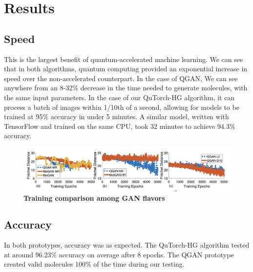 \documentclass{scrartcl}
\begin{document}
\section{Results}
\label{sec:org1d10bc6}

\subsection{Speed}
\label{sec:orgfee545b}

This is the largest benefit of quantum-accelerated machine learning.  We can see that in both algorithms, quantum computing provided an exponential increase in speed over the non-accelerated counterpart. In the case of QGAN, We can see anywhere from an 8-32\% decrease in the time needed to generate molecules, with the same input parameters. In the case of our QuTorch-HG algorithm, it can process a batch of images within 1/10th of a second, allowing for models to be trained at 95\% accuracy in under 5 minutes. A similar model, written with TensorFlow and trained on the same CPU, took 32 minutes to achieve 94.3\% accuracy.

\begin{figure}[htbp]
\centering
\includegraphics[width=.9\linewidth]{./assets/quganresults.png}
\caption{\textbf{Training comparison among GAN flavors}}
\end{figure}

\subsection{Accuracy}
\label{sec:org1872b2a}

In both prototypes, accuracy was as expected. The QuTorch-HG algorithm tested at around 96.23\% accuracy on average after 8 epochs. The QGAN prototype created valid molecules 100\% of the time during our testing.
\end{document}
